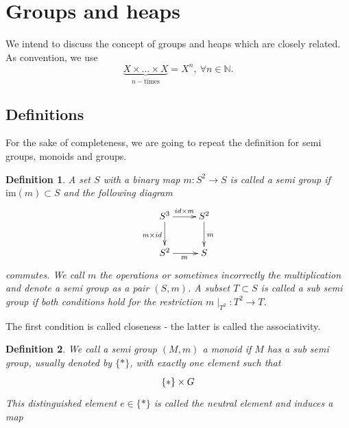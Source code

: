 \documentclass[10pt,a4paper]{article}
\author{moi}
\newtheorem{defi}{Definition}
\begin{document}
\section{Groups and heaps}
We intend to discuss the concept of groups and heaps which are closely related. As convention, we use
$$\underbrace{X \times \ldots \times X}_{n-\mathrm{times}} = X^n,\ \forall n \in \mathbb{N}.$$
\subsection{Definitions}
For the sake of completeness, we are going to repeat the definition for semi groups, monoids and groups.
\begin{defi}
A set $S$ with a binary map $m : S^2 \longrightarrow S$ is called a semi group if $\mathrm{im}(m) \subset S$ and the following diagram
$$\xymatrix{S^3 \ar[r]^{id \times m}\ar[d]_{m \times id} & S^2\ar[d]^m\\
S^2 \ar[r]_m &S\\
}$$
commutes. We call $m$ the operations or sometimes incorrectly the multiplication and denote a semi group as a pair $(S,m)$. A subset $T \subset S$ is called a sub semi group if both conditions hold for the restriction $m \mid_{T^2} : T^2 \longrightarrow T$. 
\end{defi}
The first condition is called closeness - the latter is called the associativity. 
\begin{defi}
We call a semi group $(M,m)$ a monoid if $M$ has a sub semi group, usually denoted by $\{\ast\}$, with exactly one element such that
$$\xymatrix{
\{\ast\} \times G 
}$$
This distinguished element $e \in \{\ast\}$ is called the neutral element and induces a map
$$
\end{defi}
\end{document}
